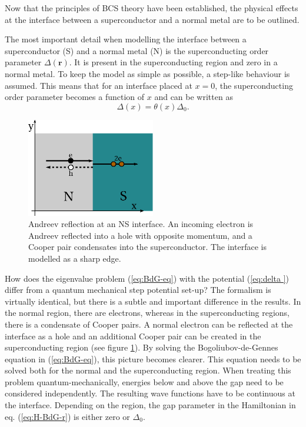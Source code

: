 Now that the principles of BCS theory have been established, the physical effects at the interface between a superconductor and a normal metal are to be outlined.

The most important detail when modelling the interface between a superconductor (S) and a normal metal (N) is the superconducting order parameter $\Delta \left( \mathbf{r} \right)$. It is present in the superconducting region and zero in a normal metal. To keep the model as simple as possible, a step-like behaviour is assumed. This means that for an interface placed at $x=0$, the superconducting order parameter becomes a function of $x$ and can be written as
\begin{equation}
\Delta \left( x \right) = \theta \left(x \right) \Delta_0.\label{eq:delta }
\end{equation}
\begin{figure}
\centering
\includegraphics[width=0.5\textwidth]{figure/framework-analytical/ns-interface_csch}
\caption{Andreev reflection at an NS interface. An incoming electron is Andreev reflected into a hole with opposite momentum, and a Cooper pair condensates into the superconductor. The interface is modelled as a sharp edge.}\label{fig:ns-interface}
\end{figure}
How does the eigenvalue problem (\ref{eq:BdG-eq}) with the potential (\ref{eq:delta }) differ from a quantum mechanical step potential set-up? The formalism is virtually identical, but there is a subtle and important difference in the results. In the normal region, there are electrons, whereas in the superconducting regions, there is a condensate of Cooper pairs. A normal electron can be reflected at the interface as a hole and an additional Cooper pair can be created in the superconducting region (see figure \ref{fig:ns-interface}). By solving the Bogoliubov-de-Gennes equation in (\ref{eq:BdG-eq}), this picture becomes clearer.  This equation needs to be solved both for the normal and the superconducting region. When treating this problem quantum-mechanically, energies below and above the gap need to be considered independently. The resulting wave functions have to be continuous at the interface. Depending on the region, the gap parameter in the Hamiltonian in eq. (\ref{eq:H-BdG-r}) is either zero or $\Delta_0$.

